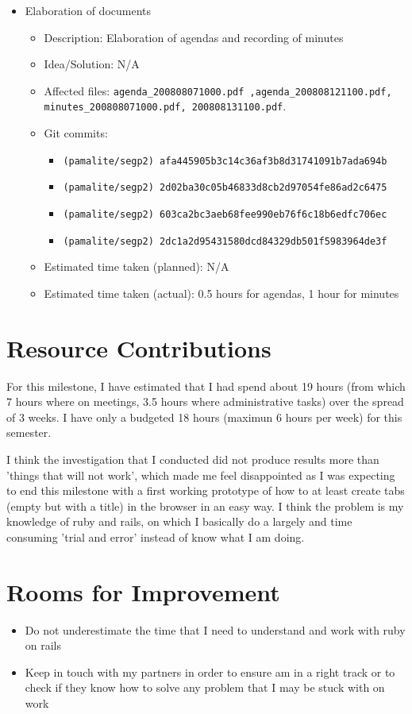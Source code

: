 \begin{itemize}
\begin{itemize}
	     \end{itemize}
	\item Elaboration of documents
	     \begin{itemize}
	         \item Description: Elaboration of agendas and recording of minutes 
	         \item Idea/Solution: N/A
	         \item Affected files: \texttt{agenda\_200808071000.pdf ,agenda\_200808121100.pdf, minutes\_200808071000.pdf, 200808131100.pdf}.  
	         \item Git commits: \begin{itemize}
	                             \item \texttt{(pamalite/segp2) afa445905b3c14c36af3b8d31741091b7ada694b}
				     \item \texttt{(pamalite/segp2) 2d02ba30c05b46833d8cb2d97054fe86ad2c6475}
				     \item \texttt{(pamalite/segp2) 603ca2bc3aeb68fee990eb76f6c18b6edfc706ec}
				     \item \texttt{(pamalite/segp2) 2dc1a2d95431580dcd84329db501f5983964de3f} 
	                            \end{itemize}
		 \item Estimated time taken (planned): N/A
	         \item Estimated time taken (actual): 0.5 hours for agendas, 1 hour for minutes
	     \end{itemize}
\end{itemize}

\section*{Resource Contributions}

For this milestone, I have estimated that I had spend about 19 hours (from which 7 hours where on meetings, 3.5 hours where administrative tasks) over the spread of 3 weeks. I have only a budgeted 18 hours (maximun 6 hours per week) for this semester. 

I think the investigation that I conducted did not produce results more than 'things that will not work', which made me feel disappointed as I was expecting to end this milestone with a first working prototype of how to at least create tabs (empty but with a title) in the browser in an easy way.  I think the problem is my knowledge of ruby and rails, on which I basically do a largely and time consuming 'trial and error' instead of know what I am doing.

\section*{Rooms for Improvement}

\begin{itemize}
   \item Do not underestimate the time that I need to understand and work with ruby on rails
   \item Keep in touch with my partners in order to ensure am in a right track or to check if they know how to solve any problem that I may be stuck with on work
\end{itemize}
